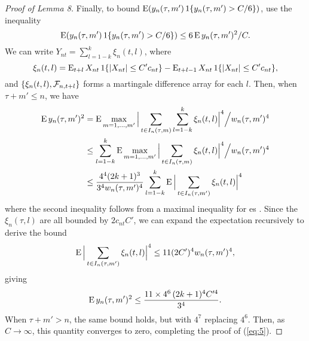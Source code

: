 \documentclass[11pt]{article}
\begin{document}
{\begin{proof}[Proof of Lemma 8]
  Finally, to bound $\operatorname{E}(y_n(\tau,m') \operatorname{1}\{y_n(\tau, m') > C/6\})$,
  use the inequality
  \begin{equation*}
    \operatorname{E}(y_n(\tau,m') \operatorname{1}\{y_n(\tau, m') > C/6\})
    \leq 6 \operatorname{E} y_n(\tau, m')^2 / C.
  \end{equation*}
  We can write $Y_{nt} = \sum_{l=1-k}^k \xi_n(t,l)$, where
  \begin{equation*}
    \xi_n(t,l) = \operatorname{E}_{t+l} X_{nt} \operatorname{1}\{|X_{nt}| \leq C' c_{nt}\}
                 - \operatorname{E}_{t+l-1} X_{nt} \operatorname{1}\{|X_{nt}| \leq C' c_{nt}\},
  \end{equation*}
  and $\{\xi_n(t,l), \mathcal{F}_{n,t+l}\}$ forms a martingale difference
  array for each $l$. Then, when $\tau + m' \leq n$, we have
  \begin{align*}
    \operatorname{E} y_n(\tau, m')^2
    &= \operatorname{E} \max_{m = 1,\dots, m'}
    \Big| \sum_{t \in I_n(\tau, m)} \sum_{l=1-k}^k \xi_n(t,l) \Big|^4 \Big/ w_{n}(\tau, m')^4 \\
    &\leq \sum_{l=1-k}^k \operatorname{E} \max_{m = 1,\dots, m'}
    \Big| \sum_{t \in I_n(\tau, m)} \xi_n(t,l) \Big|^4 \Big/ w_{n}(\tau, m')^4 \\
    &\leq \frac{4^4 (2k + 1)^3}{3^4w_{n}(\tau, m')^4}
    \sum_{l=1-k}^k \operatorname{E} \Big| \sum_{t \in I_n(\tau, m')} \xi_n(t,l) \Big|^4
  \end{align*}
  where the second inequality follows from a maximal inequality for
  \mds es \citep[Theorem 16.8]{Dav:94}. Since the $\xi_n(\tau,l)$ are
  all bounded by $2 c_{nt} C'$, we can expand the expectation
  recursively to derive the bound
  \begin{equation*}
    \operatorname{E} \Big| \sum_{t \in I_n(\tau, m')} \xi_n(t,l) \Big|^4 \leq
    11 (2 C')^4 w_{n}(\tau, m')^4,
  \end{equation*}
  \citep[For details, see][Equations 16.69--16.72]{Dav:94}
  giving
  \begin{equation*}
    \operatorname{E} y_n(\tau, m')^2 \leq \frac{11 \times 4^6\, (2k + 1)^4 C^{\prime4}}{3^4}.
  \end{equation*}
  When $\tau + m' > n$, the same bound holds, but with $4^7$ replacing
  $4^6$.  Then, as $C \to \infty$, this quantity converges to zero,
  completing the proof of (\ref{eq:5}).
\end{proof}
}

\end{document}
